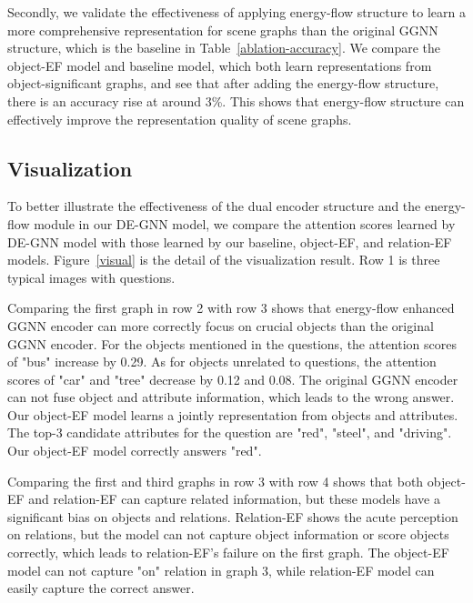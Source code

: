 \documentclass[letterpaper]{article} %
\begin{document}
Secondly, we validate the effectiveness of applying energy-flow structure to learn a more comprehensive representation for scene graphs than the original GGNN structure, which is the baseline in Table~\ref{ablation-accuracy}. We compare the object-EF model and baseline model, which both learn representations from object-significant graphs, and see that after adding the energy-flow structure, there is an accuracy rise at around 3\%. This shows that energy-flow structure can effectively improve the representation quality of scene graphs. 


\subsection{Visualization}
To better illustrate the effectiveness of the dual encoder structure and the energy-flow module in our DE-GNN model, we compare the attention scores learned by DE-GNN model with those learned by our baseline, object-EF, and relation-EF models. Figure~\ref{visual} is the detail of the visualization result. Row 1 is three typical images with questions. 

Comparing the first graph in row 2 with row 3 shows that energy-flow enhanced GGNN encoder can more correctly focus on crucial objects than the original GGNN encoder. For the objects mentioned in the questions, the attention scores of "bus" increase by 0.29. As for objects unrelated to questions, the attention scores of "car" and "tree" decrease by 0.12 and 0.08. The original GGNN encoder can not fuse object and attribute information, which leads to the wrong answer. Our object-EF model learns a jointly representation from objects and attributes. The top-3 candidate attributes for the question are "red", "steel", and "driving". Our object-EF model correctly answers "red".

Comparing the first and third graphs in row 3 with row 4 shows that both object-EF and relation-EF can capture related information, but these models have a significant bias on objects and relations. Relation-EF shows the acute perception on relations, but the model can not capture object information or score objects correctly, which leads to relation-EF's failure on the first graph. The object-EF model can not capture "on" relation in graph 3, while relation-EF model can easily capture the correct answer.
\end{document}
